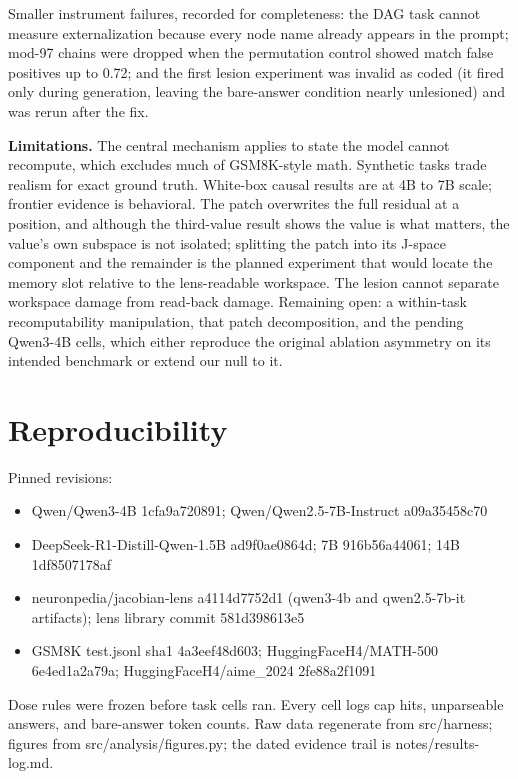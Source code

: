 Smaller instrument failures, recorded for completeness: the DAG task
cannot measure externalization because every node name already appears
in the prompt; mod-97 chains were dropped when the permutation control
showed match false positives up to 0.72; and the first lesion experiment
was invalid as coded (it fired only during generation, leaving the
bare-answer condition nearly unlesioned) and was rerun after the fix.

\textbf{Limitations.} The central mechanism applies to state the model
cannot recompute, which excludes much of GSM8K-style math. Synthetic
tasks trade realism for exact ground truth. White-box causal results are
at 4B to 7B scale; frontier evidence is behavioral. The patch overwrites
the full residual at a position, and although the third-value result
shows the value is what matters, the value's own subspace is not
isolated; splitting the patch into its J-space component and the
remainder is the planned experiment that would locate the memory slot
relative to the lens-readable workspace. The lesion cannot separate
workspace damage from read-back damage. Remaining open: a within-task
recomputability manipulation, that patch decomposition, and the pending
Qwen3-4B cells, which either reproduce the original ablation asymmetry
on its intended benchmark or extend our null to it.

\section{Reproducibility}\label{reproducibility}

Pinned revisions:

\begin{itemize}
\tightlist
\item
  Qwen/Qwen3-4B 1cfa9a720891; Qwen/Qwen2.5-7B-Instruct a09a35458c70
\item
  DeepSeek-R1-Distill-Qwen-1.5B ad9f0ae0864d; 7B 916b56a44061; 14B
  1df8507178af
\item
  neuronpedia/jacobian-lens a4114d7752d1 (qwen3-4b and qwen2.5-7b-it
  artifacts); lens library commit 581d398613e5
\item
  GSM8K test.jsonl sha1 4a3eef48d603; HuggingFaceH4/MATH-500
  6e4ed1a2a79a; HuggingFaceH4/aime\_2024 2fe88a2f1091
\end{itemize}

Dose rules were frozen before task cells ran. Every cell logs cap hits,
unparseable answers, and bare-answer token counts. Raw data regenerate
from src/harness; figures from src/analysis/figures.py; the dated
evidence trail is notes/results-log.md.
